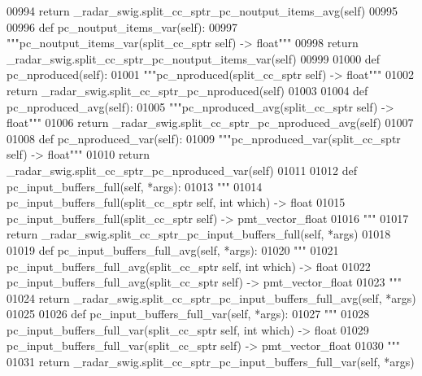 \begin{DoxyCode}
{{{{{00994         \textcolor{keywordflow}{return} \_radar\_swig.split\_cc\_sptr\_pc\_noutput\_items\_avg(self)
00995 
00996     \textcolor{keyword}{def }pc_noutput_items_var(self):
00997         \textcolor{stringliteral}{"""pc\_noutput\_items\_var(split\_cc\_sptr self) -> float"""}
00998         \textcolor{keywordflow}{return} \_radar\_swig.split\_cc\_sptr\_pc\_noutput\_items\_var(self)
00999 
01000     \textcolor{keyword}{def }pc_nproduced(self):
01001         \textcolor{stringliteral}{"""pc\_nproduced(split\_cc\_sptr self) -> float"""}
01002         \textcolor{keywordflow}{return} \_radar\_swig.split\_cc\_sptr\_pc\_nproduced(self)
01003 
01004     \textcolor{keyword}{def }pc_nproduced_avg(self):
01005         \textcolor{stringliteral}{"""pc\_nproduced\_avg(split\_cc\_sptr self) -> float"""}
01006         \textcolor{keywordflow}{return} \_radar\_swig.split\_cc\_sptr\_pc\_nproduced\_avg(self)
01007 
01008     \textcolor{keyword}{def }pc_nproduced_var(self):
01009         \textcolor{stringliteral}{"""pc\_nproduced\_var(split\_cc\_sptr self) -> float"""}
01010         \textcolor{keywordflow}{return} \_radar\_swig.split\_cc\_sptr\_pc\_nproduced\_var(self)
01011 
01012     \textcolor{keyword}{def }pc_input_buffers_full(self, *args):
01013         \textcolor{stringliteral}{"""}
01014 \textcolor{stringliteral}{        pc\_input\_buffers\_full(split\_cc\_sptr self, int which) -> float}
01015 \textcolor{stringliteral}{        pc\_input\_buffers\_full(split\_cc\_sptr self) -> pmt\_vector\_float}
01016 \textcolor{stringliteral}{        """}
01017         \textcolor{keywordflow}{return} \_radar\_swig.split\_cc\_sptr\_pc\_input\_buffers\_full(self, *args)
01018 
01019     \textcolor{keyword}{def }pc_input_buffers_full_avg(self, *args):
01020         \textcolor{stringliteral}{"""}
01021 \textcolor{stringliteral}{        pc\_input\_buffers\_full\_avg(split\_cc\_sptr self, int which) -> float}
01022 \textcolor{stringliteral}{        pc\_input\_buffers\_full\_avg(split\_cc\_sptr self) -> pmt\_vector\_float}
01023 \textcolor{stringliteral}{        """}
01024         \textcolor{keywordflow}{return} \_radar\_swig.split\_cc\_sptr\_pc\_input\_buffers\_full\_avg(self, *args)
01025 
01026     \textcolor{keyword}{def }pc_input_buffers_full_var(self, *args):
01027         \textcolor{stringliteral}{"""}
01028 \textcolor{stringliteral}{        pc\_input\_buffers\_full\_var(split\_cc\_sptr self, int which) -> float}
01029 \textcolor{stringliteral}{        pc\_input\_buffers\_full\_var(split\_cc\_sptr self) -> pmt\_vector\_float}
01030 \textcolor{stringliteral}{        """}
01031         \textcolor{keywordflow}{return} \_radar\_swig.split\_cc\_sptr\_pc\_input\_buffers\_full\_var(self, *args)
}}}}}
\end{DoxyCode}

